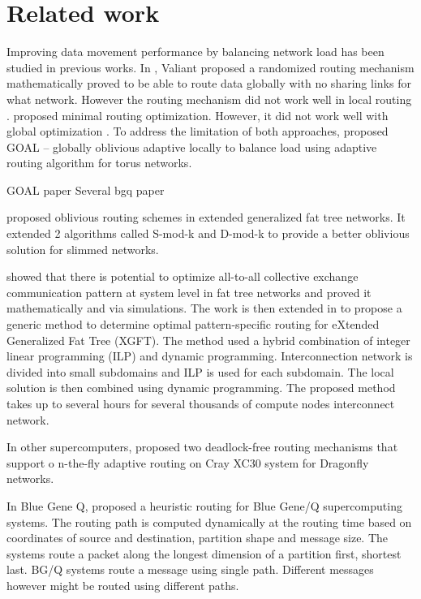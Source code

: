 \section{Related work}
\label{sec:relatedwork}

Improving data movement performance by balancing network load has been studied in previous works. In \cite{Valiant81:Routing}, Valiant proposed a randomized routing mechanism mathematically proved to be able to route data globally with no sharing links for what network. However the routing mechanism did not work well in local routing \cite{singh2003:GOAL} . \cite{Pifarre91} proposed minimal routing optimization. However, it did not work well with global optimization \cite{singh2003:GOAL} . To address the limitation of both approaches, \cite{singh2003:GOAL} proposed GOAL – globally oblivious adaptive locally to balance load using adaptive routing algorithm for torus networks.

GOAL paper \cite{singh2003:GOAL}
Several bgq paper

\cite{Rodriguez09} proposed oblivious routing schemes in extended generalized fat tree networks. It extended 2 algorithms called S-mod-k and D-mod-k to provide a better oblivious solution for slimmed networks. 

\cite{Prisacari13a} showed that there is potential to optimize all-to-all collective exchange communication pattern at system level in fat tree networks and proved it mathematically and via simulations. The work is then extended in \cite{Prisacari13b} to propose a generic method to determine optimal pattern-specific routing for eXtended Generalized Fat Tree (XGFT). The method used a hybrid combination of integer linear programming (ILP) and dynamic programming. Interconnection network is divided into small subdomains and ILP is used for each subdomain. The local solution is then combined using dynamic programming. The proposed method takes up to several hours for several thousands of compute nodes interconnect network.

In other supercomputers, \cite{garcia2013:CrayDragonfly} proposed two deadlock-free routing mechanisms that support o
n-the-fly adaptive routing on Cray XC30 system for Dragonfly networks.

In Blue Gene Q, \cite{Chen:BGQ} proposed a heuristic routing for Blue Gene/Q supercomputing systems. The routing path is computed dynamically at the routing time based on coordinates of source and destination, partition shape and message size. The systems route a packet along the longest dimension of a partition first, shortest last. BG/Q systems route a message using single path. Different messages however might be routed using different paths.

